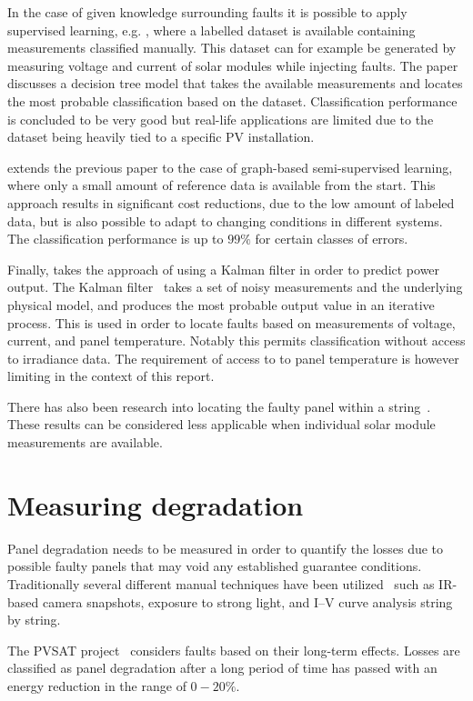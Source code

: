 In the case of given knowledge surrounding faults it is possible to apply supervised learning, e.g. \cite{Zhao2012tree},
where a labelled dataset is available containing measurements classified manually.
This dataset can for example be generated by measuring voltage and current of solar modules while injecting faults.
The paper discusses a decision tree model that takes the available measurements and locates the most probable classification based on the dataset.
Classification performance is concluded to be very good but real-life applications are limited due to the dataset being heavily tied to a specific PV installation.

\cite{Zhao2013graph} extends the previous paper to the case of graph-based semi-supervised learning, where only a small amount of reference data is available from the start.
This approach results in significant cost reductions, due to the low amount of labeled data, but is also possible to adapt to changing conditions in different systems.
The classification performance is up to $99\%$ for certain classes of errors.

Finally, \cite{Kang2012} takes the approach of using a Kalman filter in order to predict power output.
The Kalman filter~\cite{Kang2012} takes a set of noisy measurements and the underlying physical model, and produces the most probable output value in an iterative process.
This is used in order to locate faults based on measurements of voltage, current, and panel temperature.
Notably this permits classification without access to irradiance data.
The requirement of access to to panel temperature is however limiting in the context of this report.

There has also been research into locating the faulty panel within a string~\cite{Lin2012}.
These results can be considered less applicable when individual solar module measurements are available.

\section{Measuring degradation}
Panel degradation needs to be measured in order to quantify the losses due to possible faulty panels that may void any established guarantee conditions.
Traditionally several different manual techniques have been utilized~\cite{Munoz2011} such as IR-based camera snapshots, exposure to strong light, and I–V curve analysis string by string.

The PVSAT project~\cite{Stettler2005} considers faults based on their long-term effects.
Losses are classified as panel degradation after a long period of time has passed with an energy reduction in the range of $0-20\%$.

